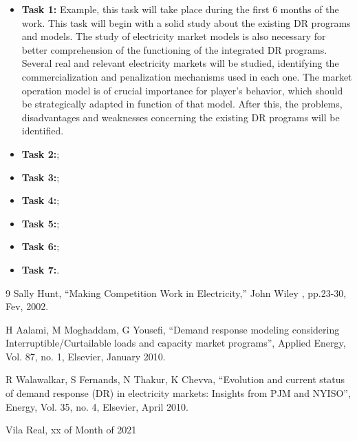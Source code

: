 \documentclass[12pt]{article}
\begin{document}
\begin{itemize}
\item \textbf{Task 1:} Example, this task will take place during the first 6 months of the work.  This task will begin with a solid study about the existing DR programs and models. The study of electricity market models is also necessary for better comprehension of the functioning of the integrated DR programs. Several real and relevant electricity markets will be studied, identifying the commercialization and penalization mechanisms used in each one.  The market operation model is of crucial importance for player’s behavior, which should be strategically adapted in function of that model. After this, the problems, disadvantages and weaknesses concerning the existing DR programs will be identified.
\item \textbf{Task 2:};
\item \textbf{Task 3:};
\item \textbf{Task 4:};
\item \textbf{Task 5:};
\item \textbf{Task 6:};
\item \textbf{Task 7:}.
\end{itemize}


\begin{thebibliography}{9}
Sally Hunt, ``Making Competition Work in Electricity,'' John Wiley , pp.23-30, Fev, 2002.

H Aalami, M Moghaddam, G Yousefi, “Demand response modeling considering Interruptible/Curtailable loads and capacity market programs”,  Applied Energy, Vol. 87, no. 1, Elsevier, January 2010.

R Walawalkar, S Fernands, N Thakur, K Chevva, “Evolution and current status of demand response (DR) in electricity markets: Insights from PJM and NYISO”, Energy, Vol. 35, no. 4, Elsevier, April 2010.

\end{thebibliography}
\vspace{20mm}
Vila Real, xx of Month of 2021\\[-5mm]
\end{document}
